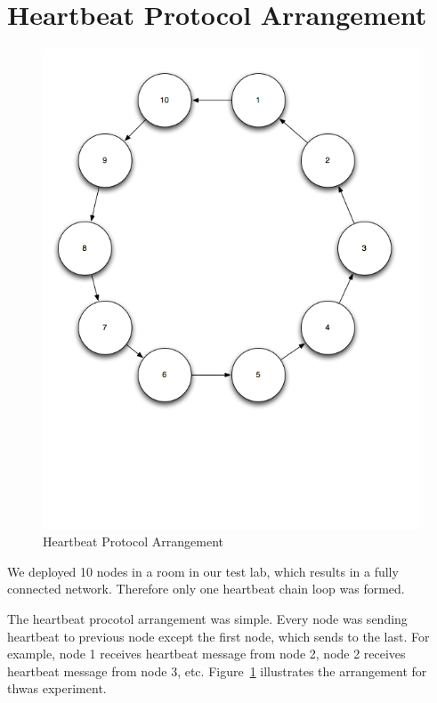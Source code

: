 \section{Heartbeat Protocol Arrangement}

\begin{figure}[h!]
\caption{Heartbeat Protocol Arrangement}
\label{fig:heartbeat-protocol-arrangement}
\centering
    \includegraphics[width=\linewidth]{figures/heartbeat-protocol-arrangement}
\end{figure}

We deployed 10 nodes in a room in our test lab, which results in a fully
connected network. Therefore only one heartbeat chain loop was formed.

The heartbeat procotol arrangement was simple. Every node was sending heartbeat to
previous node except the first node, which sends to the last. For example, node
1 receives heartbeat message from node 2, node 2 receives heartbeat message from
node 3, etc. Figure~\ref{fig:heartbeat-protocol-arrangement} illustrates the
arrangement for thwas experiment.

